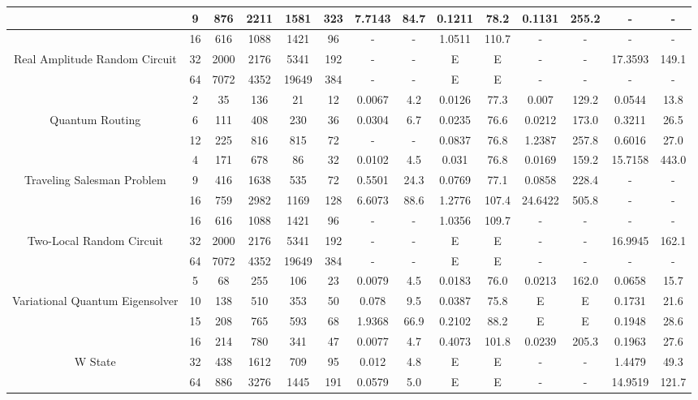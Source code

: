 \begin{table}[htb]
{\begin{tabular}{|c|c|c|c|c|c|c|c|c|c|c|c|c|c|}
 & 
9 & 876 & 2211 & 1581 & 323
 & 7.7143 & 84.7
 & 0.1211 & 78.2
 & 0.1131 & 255.2
 & - & -
 \\
\hline
 & 
16 & 616 & 1088 & 1421 & 96
 & - & -
 & 1.0511 & 110.7
 & - & -
 & - & -
 \\
Real Amplitude Random Circuit & 
32 & 2000 & 2176 & 5341 & 192
 & - & -
 & E & E
 & - & -
 & 17.3593 & 149.1
 \\
 & 
64 & 7072 & 4352 & 19649 & 384
 & - & -
 & E & E
 & - & -
 & - & -
 \\
\hline
 & 
2 & 35 & 136 & 21 & 12
 & 0.0067 & 4.2
 & 0.0126 & 77.3
 & 0.007 & 129.2
 & 0.0544 & 13.8
 \\
Quantum Routing & 
6 & 111 & 408 & 230 & 36
 & 0.0304 & 6.7
 & 0.0235 & 76.6
 & 0.0212 & 173.0
 & 0.3211 & 26.5
 \\
 & 
12 & 225 & 816 & 815 & 72
 & - & -
 & 0.0837 & 76.8
 & 1.2387 & 257.8
 & 0.6016 & 27.0
 \\
\hline
 & 
4 & 171 & 678 & 86 & 32
 & 0.0102 & 4.5
 & 0.031 & 76.8
 & 0.0169 & 159.2
 & 15.7158 & 443.0
 \\
Traveling Salesman Problem & 
9 & 416 & 1638 & 535 & 72
 & 0.5501 & 24.3
 & 0.0769 & 77.1
 & 0.0858 & 228.4
 & - & -
 \\
 & 
16 & 759 & 2982 & 1169 & 128
 & 6.6073 & 88.6
 & 1.2776 & 107.4
 & 24.6422 & 505.8
 & - & -
 \\
\hline
 & 
16 & 616 & 1088 & 1421 & 96
 & - & -
 & 1.0356 & 109.7
 & - & -
 & - & -
 \\
Two-Local Random Circuit & 
32 & 2000 & 2176 & 5341 & 192
 & - & -
 & E & E
 & - & -
 & 16.9945 & 162.1
 \\
 & 
64 & 7072 & 4352 & 19649 & 384
 & - & -
 & E & E
 & - & -
 & - & -
 \\
\hline
 & 
5 & 68 & 255 & 106 & 23
 & 0.0079 & 4.5
 & 0.0183 & 76.0
 & 0.0213 & 162.0
 & 0.0658 & 15.7
 \\
Variational Quantum Eigensolver & 
10 & 138 & 510 & 353 & 50
 & 0.078 & 9.5
 & 0.0387 & 75.8
 & E & E
 & 0.1731 & 21.6
 \\
 & 
15 & 208 & 765 & 593 & 68
 & 1.9368 & 66.9
 & 0.2102 & 88.2
 & E & E
 & 0.1948 & 28.6
 \\
\hline
 & 
16 & 214 & 780 & 341 & 47
 & 0.0077 & 4.7
 & 0.4073 & 101.8
 & 0.0239 & 205.3
 & 0.1963 & 27.6
 \\
W State & 
32 & 438 & 1612 & 709 & 95
 & 0.012 & 4.8
 & E & E
 & - & -
 & 1.4479 & 49.3
 \\
 & 
64 & 886 & 3276 & 1445 & 191
 & 0.0579 & 5.0
 & E & E
 & - & -
 & 14.9519 & 121.7
 \\
\hline
\end{tabular}}
\end{table}